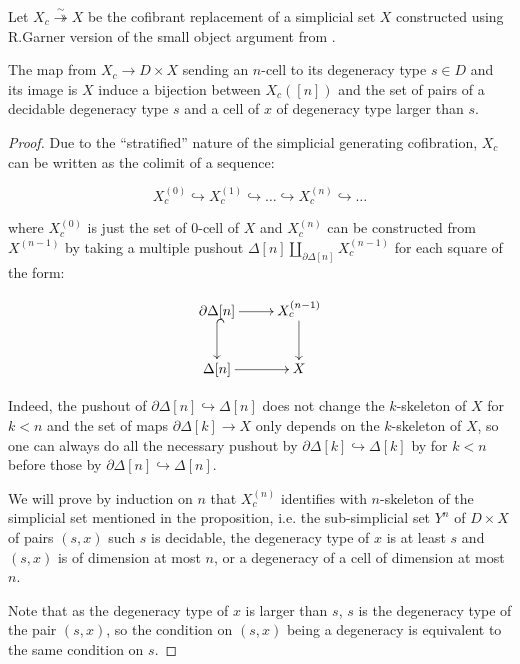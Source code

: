 \documentclass[reqno,10pt,a4paper,oneside,draft]{amsart}
\begin{document}
Let $X_c \overset{\sim}{\twoheadrightarrow} X $ be the cofibrant replacement of a simplicial set $X$ constructed using R.Garner version of the small object argument from \cite{garner:small-object-argument}.

\begin{proposition}
The map from $X_c \rightarrow D \times X$ sending an $n$-cell to its degeneracy type $s \in D$ and its image is $X$ induce a bijection between $X_c([n])$ and the set of pairs of a decidable degeneracy type $s$ and a cell of $x$ of degeneracy type larger than $s$.
\end{proposition}

\begin{proof}

Due to the ``stratified'' nature of the simplicial generating cofibration, $X_c$ can be written as the colimit of a sequence:


 \[ X^{(0)}_c \hookrightarrow X^{(1)}_c \hookrightarrow \dots \hookrightarrow X^{(n)}_c \hookrightarrow \dots \]

where $X^{(0)}_c$ is just the set of $0$-cell of $X$ and $X^{(n)}_c$ can be constructed from $X^{(n-1)}$ by taking a multiple pushout $\Delta[n] \coprod_{\partial \Delta[n]} X^{(n-1)}_c$ for each square of the form:

\[ \xymatrix{\partial \Delta[n]  \ar[r] \ar@{^{(}->}[d] & X^{(n-1)}_c \ar[d] \\ \Delta[n]  \ar[r] & X} \]

Indeed, the pushout of $\partial \Delta[n] \hookrightarrow \Delta[n]$ does not change the $k$-skeleton of $X$ for $k <n$ and the set of maps $\partial \Delta[k] \rightarrow X$ only depends on the $k$-skeleton of $X$, so one can always do all the necessary pushout by $\partial \Delta[k] \hookrightarrow \Delta[k]$ by for $k<n$ before those by $\partial \Delta[n] \hookrightarrow \Delta[n]$.


We will prove by induction on $n$ that $X^{(n)}_c$ identifies with $n$-skeleton of the simplicial set mentioned in the proposition, i.e. the sub-simplicial set $Y^n$ of $D \times X$ of pairs $(s,x)$ such $s$ is decidable,  the degeneracy type of $x$ is at least $s$ and $(s,x)$ is of dimension at most $n$, or a degeneracy of a cell of dimension at most $n$.

Note that as the degeneracy type of $x$ is larger than $s$, $s$ is the degeneracy type of the pair $(s,x)$, so the condition on $(s,x)$ being a degeneracy is equivalent to the same condition on $s$.


\end{proof}
\end{document}
